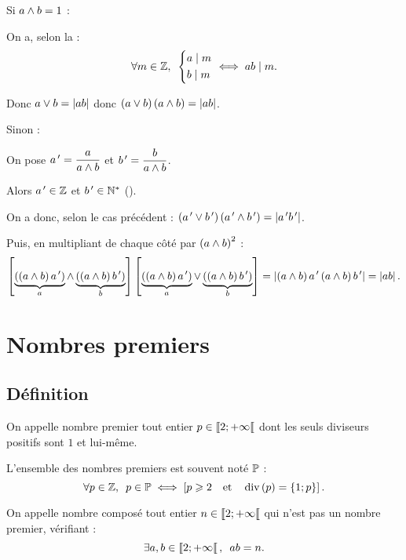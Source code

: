 \begin{dem}
Si \(a\land b=1\) :

On a, selon la  : \[\quantifs{\forall m\in\Z}\begin{dcases}a\divise m \\ b\divise m\end{dcases}\ssi ab\divise m.\]

Donc \(a\lor b=\left\lvert ab\right\rvert\) donc \(\left(a\lor b\right)\left(a\land b\right)=\left\lvert ab\right\rvert\).

Sinon :

On pose \(a^{\,\prime}=\dfrac{a}{a\land b}\) et \(b^{\,\prime}=\dfrac{b}{a\land b}\).

Alors \(a^{\,\prime}\in\mathbb{Z}\) et \(b^{\,\prime}\in\mathbb{N}^*\) (\cf {}).

On a donc, selon le cas précédent : \(\left(a^{\,\prime}\lor b^{\,\prime}\right)\left(a^{\,\prime}\land b^{\,\prime}\right)=\left\lvert a^{\,\prime} b^{\,\prime}\right\rvert\).

Puis, en multipliant de chaque côté par \(\left(a\land b\right)^2\) : \[\left[\underbrace{\left(\left(a\land b\right)a^{\,\prime}\right)}_{a}\land\underbrace{\left(\left(a\land b\right)b^{\,\prime}\right)}_b\right]\left[\underbrace{\left(\left(a\land b\right)a^{\,\prime}\right)}_a\lor\underbrace{\left(\left(a\land b\right)b^{\,\prime}\right)}_b\right]=\left\lvert\left(a\land b\right)a^{\,\prime}\left(a\land b\right)b^{\,\prime}\right\rvert=\left\lvert ab\right\rvert.\]
\end{dem}

\section{Nombres premiers}

\subsection{Définition}

\begin{defi}
On appelle nombre premier tout entier \(p\in\left\llbracket2;+\infty\right\llbracket\) dont les seuls diviseurs positifs sont \(1\) et lui-même.

L'ensemble des nombres premiers est souvent noté \(\mathbb{P}\) : \[\quantifs{\forall p\in\Z}p\in\prem\ssi\croch{p\geq2\quad\text{et}\quad\ensdiv{p}=\accol{1;p}}.\]
\end{defi}

\begin{defi}
On appelle nombre composé tout entier \(n\in\left\llbracket2;+\infty\right\llbracket\) qui n'est pas un nombre premier, \cad vérifiant : \[\quantifs{\exists a,b\in\interventierie{2}{\pinf}}ab=n.\]
\end{defi}

